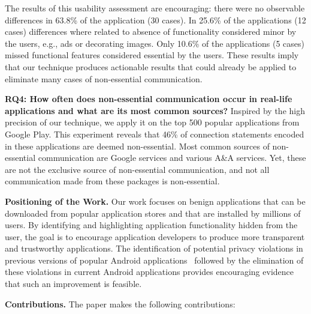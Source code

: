 The results of this usability assessment are encouraging: there were no observable differences in 63.8\% of the application (30 cases). In 25.6\% of the applications (12 cases) differences where related to absence of functionality considered minor by the users, e.g., ads or decorating images. Only 10.6\% of the applications (5 cases) missed functional features considered essential by the users. 
These results imply that our technique produces actionable results that could already be applied to eliminate many cases of non-essential communication. 


\noindent 
{\bf RQ4: How often does non-essential communication occur in real-life applications and what are its most common sources?}
Inspired by the high precision of our technique, we apply it on the top 500 popular applications from Google Play. This experiment reveals that 46\% of connection statements encoded in these applications 
are deemed non-essential.
Most common sources of non-essential communication are Google services %
and various A\&A services. Yet, these are not the exclusive source of non-essential communication, and not all communication made from these packages is non-essential. 

\noindent 
{\bf Positioning of the Work.}  Our work focuses on benign
applications that can be downloaded from popular application stores
and that are installed by millions of users.  By identifying and
highlighting application functionality hidden from the user, the goal
is to encourage application developers to produce more transparent and
trustworthy applications. The identification of potential privacy
violations in previous versions of popular Android
applications~\cite{Enck:Gilbert:Chun:Cox:Jung:McDaniel:Sheth:OSDI10,Egele:Kruegel:Kirda:Vign:NDSS11,Tripp:Rubin:SEC14} followed by the
elimination of these violations in current Android applications
provides encouraging evidence that such an improvement is feasible.

\noindent 
{\bf Contributions.}
The paper makes the following contributions:

